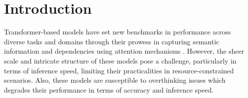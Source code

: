 \section{Introduction}
Transformer-based models \citep{ devlin2018bert, radford2019language,cornia2020meshed, luo2021dual,li2022blip, li2023blip} have set new benchmarks in performance across diverse tasks and domains through their prowess in capturing semantic information and dependencies using attention mechanisms \citep{vaswani2017attention}. However, the sheer scale and intricate structure of these models pose a challenge, particularly in terms of inference speed, limiting their practicalities in resource-constrained scenarios. Also, these models are susceptible to overthinking issues \citep{zhou2020bert, zhu2021leebert} which degrades their performance in terms of accuracy and inference speed. 




